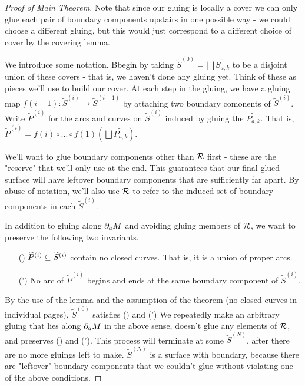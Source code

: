 \begin{proof}[Proof of Main Theorem]
Note that since our gluing is locally a cover we can only glue each pair of
boundary components upstairs in one possible way - we could choose a different
gluing, but this would just correspond to a different choice of cover by the
covering lemma.

We introduce some notation. Bbegin by taking $\widetilde{S}^{(0)} = \bigsqcup \widetilde{S_{a,k}}$ to
be a disjoint union of these covers - that is, we haven't done any gluing yet.
Think of these as pieces we'll use to build our cover. At each step in the
gluing, we have a gluing map $f(i+1) \colon \widetilde{S}^{(i)} \to
\widetilde{S}^{(i+1)}$ by attaching two boundary comonents of
$\widetilde{S}^{(i)}$. Write $\widetilde{P}^{(i)}$ for the arcs and curves on
$\widetilde{S}^{(i)}$ induced by gluing the $\widetilde{P_{a,k}}$.  That is,
$\widetilde{P}^{(i)} = f(i) \circ ...  \circ f(1) (\bigsqcup
\widetilde{P_{a,k}})$.

We'll want to glue boundary components other than $\mathcal{R}$ first - these are the
"reserve" that we'll only use at the end. This guarantees that our final glued
surface will have leftover boundary components that are sufficiently far apart.
By abuse of notation, we'll also use $\mathcal{R}$ to refer to the induced set of
boundary components in each $\widetilde{S}^{(i)}$.

In addition to gluing along $\partial_aM$ and avoiding gluing members of $\mathcal{R}$, we want
to preserve the following two invariants.


\begin{enumerate}

\item[(\dag)] $\widetilde{P}^{(i)} \subseteq \widetilde{S}^{(i)}$ contain no closed
curves.  That is, it is a union of proper arcs. \label{I:dag}

\item[(\dag')] No arc of $\widetilde{P}^{(i)}$ begins and ends at the same
boundary component of $\widetilde{S}^{(i)}$. \label{I:dag'}

\end{enumerate}

By the use of the lemma and the assumption of the theorem (no closed curves in
individual pages), $\widetilde{S}^{(0)}$ satisfies (\dag) and (\dag') We
repeatedly make an arbitrary gluing that lies along $\partial_aM$ in the above
sense, doesn't glue any elements of $\mathcal{R}$, and preserves (\dag) and (\dag').  This
process will terminate at some $\widetilde{S}^{(N)}$, after there are no more
gluings left to make. $\widetilde{S}^{(N)}$ is a surface with boundary, because
there are "leftover" boundary components that we couldn't glue without
violating one of the above conditions.


\end{proof}
